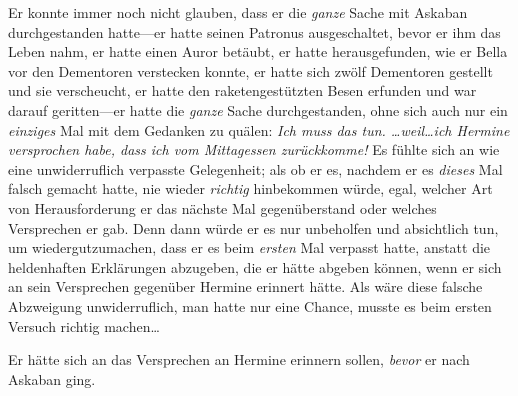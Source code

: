 Er konnte immer noch nicht glauben, dass er die \emph{ganze} Sache mit Askaban durchgestanden hatte—er hatte seinen Patronus ausgeschaltet, bevor er ihm das Leben nahm, er hatte einen Auror betäubt, er hatte herausgefunden, wie er Bella vor den Dementoren verstecken konnte, er hatte sich zwölf Dementoren gestellt und sie verscheucht, er hatte den raketengestützten Besen erfunden und war darauf geritten—er hatte die \emph{ganze} Sache durchgestanden, ohne sich auch nur ein \emph{einziges} Mal mit dem Gedanken zu quälen: \emph{Ich muss das tun. …weil…ich Hermine versprochen habe, dass ich vom Mittagessen zurückkomme!} Es fühlte sich an wie eine unwiderruflich verpasste Gelegenheit; als ob er es, nachdem er es \emph{dieses} Mal falsch gemacht hatte, nie wieder \emph{richtig} hinbekommen würde, egal, welcher Art von Herausforderung er das nächste Mal gegenüberstand oder welches Versprechen er gab. Denn dann würde er es nur unbeholfen und absichtlich tun, um wiedergutzumachen, dass er es beim \emph{ersten} Mal verpasst hatte, anstatt die heldenhaften Erklärungen abzugeben, die er hätte abgeben können, wenn er sich an sein Versprechen gegenüber Hermine erinnert hätte. Als wäre diese falsche Abzweigung unwiderruflich, man hatte nur eine Chance, musste es beim ersten Versuch richtig machen…

Er hätte sich an das Versprechen an Hermine erinnern sollen, \emph{bevor} er nach Askaban ging.

